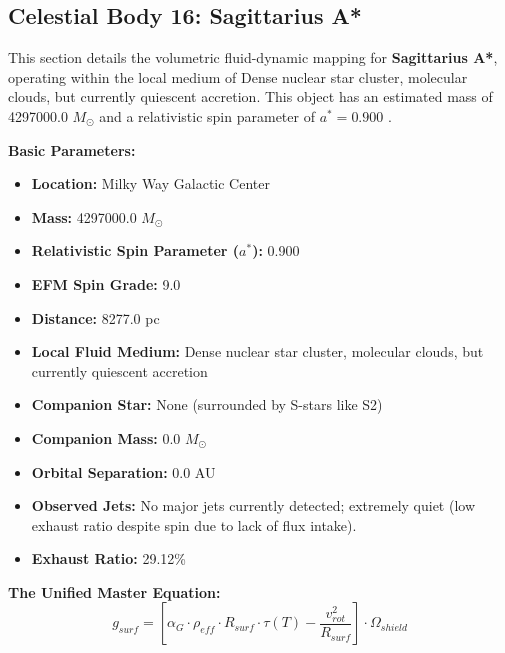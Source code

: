 \documentclass[11pt, a4paper]{article}
\begin{document}
\clearpage
\subsection{Celestial Body 16: Sagittarius A*}
This section details the volumetric fluid-dynamic mapping for \textbf{Sagittarius A*}, operating within the local medium of Dense nuclear star cluster, molecular clouds, but currently quiescent accretion. This object has an estimated mass of 4297000.0 $M_{\odot}$ and a relativistic spin parameter of $a^* = 0.900$ \cite{eventhorizontelescopecollaboration2022, simbad}.

\vspace{0.5em}
\noindent \textbf{Basic Parameters:}
\begin{itemize}
  \item \textbf{Location:} Milky Way Galactic Center
  \item \textbf{Mass:} 4297000.0 $M_{\odot}$
  \item \textbf{Relativistic Spin Parameter ($a^*$):} 0.900
  \item \textbf{EFM Spin Grade:} 9.0
  \item \textbf{Distance:} 8277.0 pc
  \item \textbf{Local Fluid Medium:} Dense nuclear star cluster, molecular clouds, but currently quiescent accretion
  \item \textbf{Companion Star:} None (surrounded by S-stars like S2)
  \item \textbf{Companion Mass:} 0.0 $M_{\odot}$
  \item \textbf{Orbital Separation:} 0.0 AU
  \item \textbf{Observed Jets:} No major jets currently detected; extremely quiet (low exhaust ratio despite spin due to lack of flux intake).
  \item \textbf{Exhaust Ratio:} 29.12\%
\end{itemize}

\vspace{0.5em}
\noindent \textbf{The Unified Master Equation:}
$$ g_{surf} = \left[ \alpha_G \cdot \rho_{eff} \cdot R_{surf} \cdot \tau(T) - \frac{v_{rot}^2}{R_{surf}} \right] \cdot \Omega_{shield} $$
\end{document}
